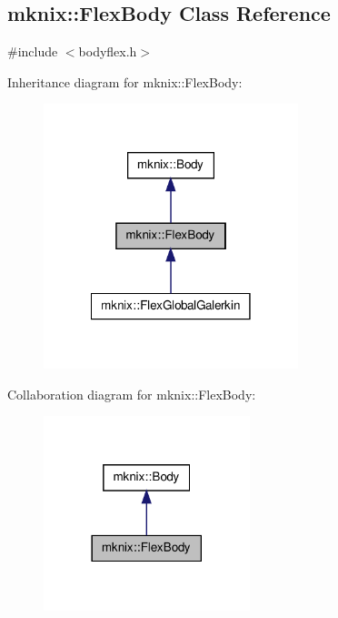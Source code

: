 \hypertarget{classmknix_1_1_flex_body}{\subsection{mknix\-:\-:Flex\-Body Class Reference}
\label{classmknix_1_1_flex_body}
}


{\ttfamily \#include $<$bodyflex.\-h$>$}



Inheritance diagram for mknix\-:\-:Flex\-Body\-:\nopagebreak
\begin{figure}[H]
\begin{center}
\leavevmode
\includegraphics[width=210pt]{d5/d29/classmknix_1_1_flex_body__inherit__graph}
\end{center}
\end{figure}


Collaboration diagram for mknix\-:\-:Flex\-Body\-:\nopagebreak
\begin{figure}[H]
\begin{center}
\leavevmode
\includegraphics[width=170pt]{d4/d5c/classmknix_1_1_flex_body__coll__graph}
\end{center}
\end{figure}
